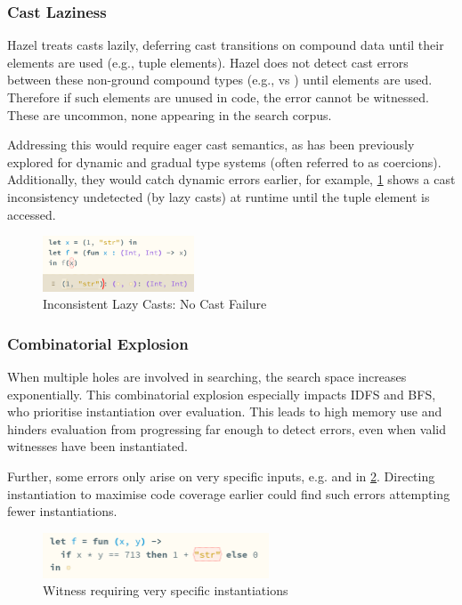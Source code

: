 \subsubsection{Cast Laziness}\label{sec:EvalCastLaziness}
Hazel treats casts lazily, deferring cast transitions on compound data until their elements are used (e.g., tuple elements). Hazel does not detect cast errors between these non-ground compound types (e.g., \code{[Int]} vs \code{[String]}) until elements are used. Therefore if such elements are unused in code, the error cannot be witnessed. These are uncommon, none appearing in the search corpus.

Addressing this would require eager cast semantics, as has been previously explored for dynamic and gradual type systems \cite{EagerCasts, GradualEagerCasts} (often referred to as coercions). Additionally, they would catch dynamic errors earlier, for example, \cref{fig:LazyCastError} shows a cast inconsistency undetected (by lazy casts) at runtime until the tuple element is accessed.
\begin{figure}[h]
\centering
\includegraphics[width=0.4\textwidth]{Media/Figures/cast_laziness_no_error}
\caption{Inconsistent Lazy Casts: No Cast Failure}
\label{fig:LazyCastError}
\end{figure}

\subsubsection{Combinatorial Explosion}
When multiple holes are involved in searching, the search space increases exponentially. This combinatorial explosion especially impacts IDFS and BFS, who prioritise instantiation over evaluation. This leads to high memory use and hinders evaluation from progressing far enough to detect errors, even when valid witnesses have been instantiated.

Further, some errors only arise on very specific inputs, e.g.  and  in \cref{fig:SpecificInstantiations}. Directing instantiation to maximise code coverage earlier could find such errors attempting fewer instantiations.
\begin{figure}\centering
\includegraphics[width=0.6\textwidth]{Media/Figures/very_specific_error}
\caption{Witness requiring very specific instantiations}
\label{fig:SpecificInstantiations}
\end{figure}

